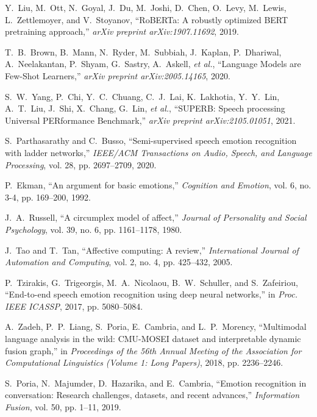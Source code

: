 \documentclass[conference]{IEEEtran}
\begin{document}
\begin{thebibliography}{00}
Y.~Liu, M.~Ott, N.~Goyal, J.~Du, M.~Joshi, D.~Chen, O.~Levy, M.~Lewis, L.~Zettlemoyer, and V.~Stoyanov,
``RoBERTa: A robustly optimized BERT pretraining approach,''
\emph{arXiv preprint arXiv:1907.11692}, 2019.

T.~B.~Brown, B.~Mann, N.~Ryder, M.~Subbiah, J.~Kaplan, P.~Dhariwal, A.~Neelakantan, P.~Shyam, G.~Sastry, A.~Askell, \emph{et al.},
``Language Models are Few-Shot Learners,''
\emph{arXiv preprint arXiv:2005.14165}, 2020.

S.~W.~Yang, P.~Chi, Y.~C.~Chuang, C.~J.~Lai, K.~Lakhotia, Y.~Y.~Lin, A.~T.~Liu, J.~Shi, X.~Chang, G.~Lin, \emph{et al.},
``SUPERB: Speech processing Universal PERformance Benchmark,''
\emph{arXiv preprint arXiv:2105.01051}, 2021.

S.~Parthasarathy and C.~Busso,
``Semi-supervised speech emotion recognition with ladder networks,''
\emph{IEEE/ACM Transactions on Audio, Speech, and Language Processing}, vol. 28, pp. 2697--2709, 2020.

P.~Ekman,
``An argument for basic emotions,''
\emph{Cognition and Emotion}, vol. 6, no. 3-4, pp. 169--200, 1992.

J.~A.~Russell,
``A circumplex model of affect,''
\emph{Journal of Personality and Social Psychology}, vol. 39, no. 6, pp. 1161--1178, 1980.

J.~Tao and T.~Tan,
``Affective computing: A review,''
\emph{International Journal of Automation and Computing}, vol. 2, no. 4, pp. 425--432, 2005.

P.~Tzirakis, G.~Trigeorgis, M.~A.~Nicolaou, B.~W.~Schuller, and S.~Zafeiriou,
``End-to-end speech emotion recognition using deep neural networks,''
in \emph{Proc. IEEE ICASSP}, 2017, pp. 5080--5084.

A.~Zadeh, P.~P.~Liang, S.~Poria, E.~Cambria, and L.~P.~Morency,
``Multimodal language analysis in the wild: CMU-MOSEI dataset and interpretable dynamic fusion graph,''
in \emph{Proceedings of the 56th Annual Meeting of the Association for Computational Linguistics (Volume 1: Long Papers)}, 2018, pp. 2236--2246.

S.~Poria, N.~Majumder, D.~Hazarika, and E.~Cambria,
``Emotion recognition in conversation: Research challenges, datasets, and recent advances,''
\emph{Information Fusion}, vol. 50, pp. 1--11, 2019.

\end{thebibliography}
\end{document}

